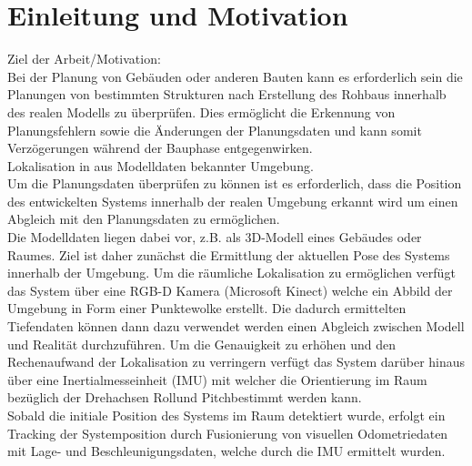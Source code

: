 \chapter{Einleitung und Motivation}


Ziel der Arbeit/Motivation:\\
Bei der Planung von Gebäuden oder anderen Bauten kann es erforderlich sein die Planungen von bestimmten Strukturen nach Erstellung des Rohbaus innerhalb des realen Modells zu überprüfen. Dies ermöglicht die Erkennung von Planungsfehlern sowie die Änderungen der Planungsdaten und kann somit Verzögerungen während der Bauphase entgegenwirken.\\

Lokalisation in aus Modelldaten bekannter Umgebung.\\
Um die Planungsdaten überprüfen zu können ist es erforderlich, dass die Position des entwickelten Systems innerhalb der realen Umgebung erkannt wird um einen Abgleich mit den Planungsdaten zu ermöglichen.\\
Die Modelldaten liegen dabei vor, z.B. als 3D-Modell eines Gebäudes oder Raumes. Ziel ist daher zunächst die Ermittlung der aktuellen Pose des Systems innerhalb der Umgebung. Um die räumliche Lokalisation zu ermöglichen verfügt das System über eine RGB-D Kamera (Microsoft Kinect) welche ein Abbild der Umgebung in Form einer Punktewolke erstellt. Die dadurch ermittelten Tiefendaten können dann dazu verwendet werden einen Abgleich zwischen Modell und Realität durchzuführen. Um die Genauigkeit zu erhöhen und den Rechenaufwand der Lokalisation zu verringern verfügt das System darüber hinaus über eine Inertialmesseinheit (IMU) mit welcher die Orientierung im Raum bezüglich der Drehachsen \glqq Roll\grqq\space und \glqq Pitch\grqq\space bestimmt werden kann.\\
Sobald die initiale Position des Systems im Raum detektiert wurde, erfolgt ein Tracking der Systemposition durch Fusionierung von visuellen Odometriedaten mit Lage- und Beschleunigungsdaten, welche durch die IMU ermittelt wurden.\\

